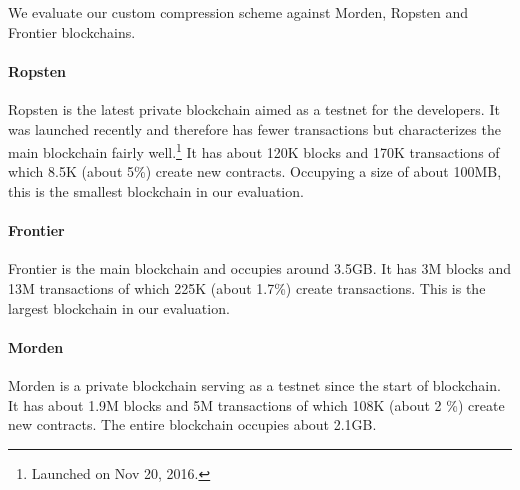 

We evaluate our custom compression scheme against Morden, Ropsten and Frontier blockchains.
\paragraph{Ropsten}
Ropsten is the latest private blockchain aimed as a testnet for the \eth{} developers. It was launched recently and therefore has fewer transactions but characterizes the main blockchain fairly well.\footnote{Launched on Nov 20, 2016.}
It has about 120K blocks and 170K transactions of which 8.5K (about 5\%) create new contracts.
Occupying a size of about 100MB, this is the smallest blockchain in our evaluation. 
\paragraph{Frontier}
Frontier is the main \eth{} blockchain and occupies around 3.5GB. It has 3M blocks and 13M transactions of which 225K (about 1.7\%) create transactions. 
This is the largest blockchain in our evaluation.

\paragraph{Morden}
Morden is a private blockchain serving as a testnet since the start of \eth{} blockchain. 
It has about 1.9M blocks and 5M transactions of which 108K (about 2 \%) create new contracts. The entire blockchain occupies about 2.1GB.

